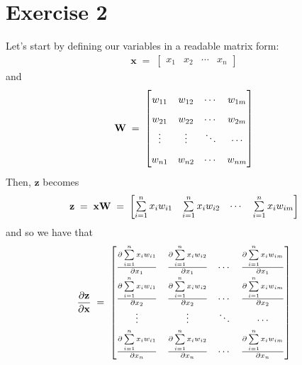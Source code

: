 \documentclass[12pt]{report}
\begin{document}
\section*{Exercise 2}
Let's start by defining our variables in a readable matrix form:
\begin{align*}
    \textbf{x} \;=\;
    \begin{bmatrix}
        x_1 & x_2 & \cdots & x_n
    \end{bmatrix}
\end{align*}
and
\begin{align*}
    \textbf{W} \;=\;
    \renewcommand\arraystretch{1.65}
    \begin{bmatrix}
        w_{11} & w_{12} & \cdots & w_{1m} \\
        w_{21} & w_{22} & \cdots & w_{2m} \\
        \vdots & \vdots & \ddots & \cdots \\
        w_{n1} & w_{n2} & \cdots & w_{nm}
    \end{bmatrix}
\end{align*}
Then, $\textbf{z}$ becomes
\begin{align*}
    \textbf{z} \;=\; \textbf{xW} \;=\;
    \renewcommand\arraystretch{1.65}
    \begin{bmatrix}
        \sum\limits_{i=1}^n x_iw_{i1} & \sum\limits_{i=1}^n x_iw_{i2}
                                      & \cdots & \sum\limits_{i=1}^n x_iw_{im}
    \end{bmatrix}
\end{align*}
and so we have that
\begin{align*}
    \frac{\partial \textbf{z}}{\partial \textbf{x}} \;=\;
    \renewcommand\arraystretch{1.8}
    \begin{bmatrix}
        \frac{\partial \sum\limits_{i=1}^n x_iw_{i1}}{\partial x_1} &
        \frac{\partial \sum\limits_{i=1}^n x_iw_{i2}}{\partial x_1} &
        \cdots &
        \frac{\partial \sum\limits_{i=1}^n x_iw_{im}}{\partial x_1} \\
        \frac{\partial \sum\limits_{i=1}^n x_iw_{i1}}{\partial x_2} &
        \frac{\partial \sum\limits_{i=1}^n x_iw_{i2}}{\partial x_2} &
        \cdots &
        \frac{\partial \sum\limits_{i=1}^n x_iw_{im}}{\partial x_2} \\
        \vdots & \vdots & \ddots & \cdots \\
        \frac{\partial \sum\limits_{i=1}^n x_iw_{i1}}{\partial x_n} &
        \frac{\partial \sum\limits_{i=1}^n x_iw_{i2}}{\partial x_n} &
        \cdots &
        \frac{\partial \sum\limits_{i=1}^n x_iw_{im}}{\partial x_n} \\
    \end{bmatrix}
\end{align*}
\end{document}

